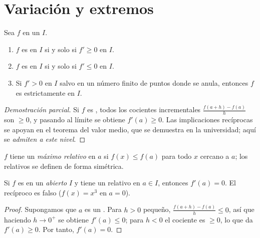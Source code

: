 \section{Variación y extremos}

\begin{theorem}\label{thm:g12:deriv:variations}
Sea $f$  en un  $I$.
\begin{enumerate}
  \item $f$ es  en $I$ si y solo si $f' \geq 0$ en $I$.
  \item $f$ es  en $I$ si y solo si $f' \leq 0$ en $I$.
  \item Si $f' > 0$ en $I$ salvo en un número finito de puntos donde se
        anula, entonces $f$ es estrictamente  en $I$.
\end{enumerate}
\end{theorem}

\begin{proof}[Demostración parcial]
Si $f$ es , todos los cocientes incrementales
$\frac{f(a+h)-f(a)}{h}$ son $\geq 0$, y pasando al límite se obtiene
$f'(a) \geq 0$. Las implicaciones recíprocas se apoyan en el teorema del
valor medio, que se demuestra en la universidad; aquí se \emph{admiten a
este nivel}.
\end{proof}

\begin{definition}\label{def:g12:deriv:extremum}
$f$ tiene un \emph{máximo relativo} en $a$ si
$f(x) \leq f(a)$ para todo $x$ cercano a $a$; los  relativos se
definen de forma simétrica.
\end{definition}

\begin{proposition}\label{prop:g12:deriv:critical}
Si $f$ es  en un  \emph{abierto} $I$ y tiene un 
relativo en $a \in I$, entonces $f'(a) = 0$. El recíproco es falso
($f(x) = x^3$ en $a = 0$).
\end{proposition}

\begin{proof}
Supongamos que $a$ es un . Para $h > 0$ pequeño,
$\frac{f(a+h)-f(a)}{h} \leq 0$, así que haciendo $h \to 0^+$ se obtiene
$f'(a) \leq 0$; para $h < 0$ el cociente es $\geq 0$, lo que da
$f'(a) \geq 0$. Por tanto, $f'(a) = 0$.
\end{proof}

